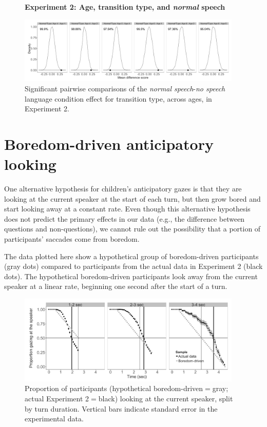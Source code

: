 \documentclass[authoryear, 12pt]{elsarticle}
\begin{document}
\begin{figure}
\begin{center}
\textbf{Experiment 2: Age, transition type, and \textit{normal} speech}\par\medskip
\includegraphics[width=0.95\textwidth]{figures/E2-child-randvsreal-ttest-normaltypesages.png}
\end{center}
\caption{Significant pairwise comparisons of the \textit{normal speech}-\textit{no speech} language condition effect for transition type, across ages, in Experiment 2.} 
\label{fig:E2-lgagetypeinteraction}
\end{figure}

\section{Boredom-driven anticipatory looking}
\label{sec:boredlooks}
\setcounter{figure}{0}  

One alternative hypothesis for children's anticipatory gazes is that they are looking at the current speaker at the start of each turn, but then grow bored and start looking away at a constant rate. Even though this alternative hypothesis does not predict the primary effects in our data (e.g., the difference between questions and non-questions), we cannot rule out the possibility that a portion of participants' saccades come from boredom.

The data plotted here show a hypothetical group of boredom-driven participants (gray dots) compared to participants from the actual data in Experiment 2 (black dots). The hypothetical boredom-driven participants look away from the current speaker at a linear rate, beginning one second after the start of a turn. 

\begin{figure}[!htb]
\begin{center}
\includegraphics[width=0.95\textwidth]{figures/boredom-hypothesis.png}
\end{center}
\caption{Proportion of participants (hypothetical boredom-driven$=$gray; actual Experiment 2$=$black) looking at the current speaker, split by turn duration. Vertical bars indicate standard error in the experimental data.} 
\label{fig:boredomhypothesis}
\end{figure}
\end{document}
